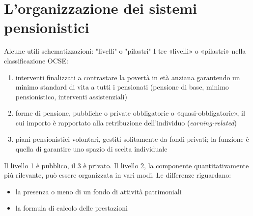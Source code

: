 \documentclass[aspectratio=64,12pt]{beamer}
\begin{document}
\section{L'organizzazione dei sistemi pensionistici}

\begin{frame}{Alcune utili schematizzazioni: "livelli" o "pilastri"}
I tre «livelli» o «pilastri» nella classificazione OCSE:
\begin{enumerate}
\item interventi finalizzati a contrastare la povertà in età anziana garantendo
un minimo standard di vita a tutti i pensionati (pensione di base, minimo
pensionistico, interventi assistenziali)
\item forme di pensione, pubbliche o private obbligatorie o «quasi-obbligatorie»,
il cui importo è rapportato alla retribuzione dell’individuo
(\emph{earning-related})
\item piani pensionistici volontari, gestiti solitamente da fondi privati; la
funzione è quella di garantire uno spazio di scelta individuale
\end{enumerate}

Il livello 1 è pubblico, il 3 è privato. Il livello 2, la componente
quantitativamente più rilevante, può essere organizzata in vari modi. Le differenze riguardano:
\begin{itemize}
\item la presenza o meno di un fondo di attività patrimoniali
\item la formula di calcolo delle prestazioni
\end{itemize}
\end{frame}
\end{document}
